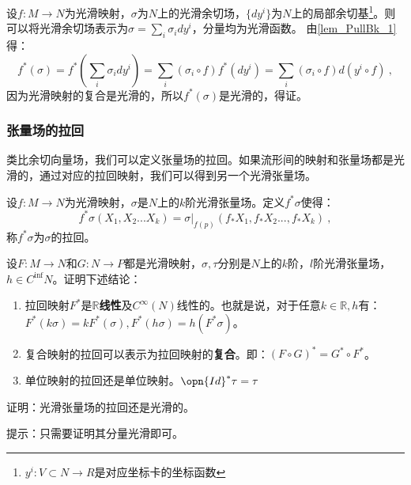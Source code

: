 设$f:M\rightarrow N$为光滑映射，$\sigma$为$N$上的光滑余切场，$\{dy^i\}$为$N$上的局部余切基\footnote{$y^i:V\subset N\rightarrow R$是对应坐标卡的坐标函数}。则可以将光滑余切场表示为$\sigma=\sum_i\sigma_idy^i $，分量均为光滑函数。
由\autoref{lem_PullBk_1} 得：
\begin{equation}
f^*(\sigma)=f^*(\sum_i\sigma_idy^i)=\sum_i(\sigma_i\circ f)f^*(dy^i)=\sum_i(\sigma_i\circ f)d(y^i\circ f)~,
\end{equation}
因为光滑映射的复合是光滑的，所以$f^*(\sigma)$是光滑的，得证。
\subsubsection{张量场的拉回}
类比余切向量场，我们可以定义张量场的拉回。如果流形间的映射和张量场都是光滑的，通过对应的拉回映射，我们可以得到另一个光滑张量场。
\begin{definition}{}
设$f:M\rightarrow N$为光滑映射，$\sigma$是$N$上的$k$阶光滑张量场。定义$f^*\sigma$使得：
\begin{equation}
f^*\sigma(X_1,X_2...X_k)=\sigma|_{f(p)}(f_*X_1,f_*X_2...,f_*X_k)~,
\end{equation}
称$f^*\sigma$为$\sigma$的拉回。
\end{definition}
\begin{exercise}{}
设$F:M\rightarrow N$和$G:N\rightarrow P$都是光滑映射，$\sigma,\tau$分别是$N$上的$k$阶，$l$阶光滑张量场，$h\in C^{\inf}N$。证明下述结论：
\begin{enumerate}
\item 拉回映射$F^*$是$\mathbb R$\textbf{线性}及$C^{\infty }(N)$线性的。也就是说，对于任意$k\in \mathbb R,h$有：$F^*(k\sigma)=kF^*(\sigma),F^*(h\sigma)=h(F^*\sigma)$。
\item 复合映射的拉回可以表示为拉回映射的\textbf{复合}。即：$(F\circ G)^{*}=G^*\circ F^*$。
\item 单位映射的拉回还是单位映射。$\opn{Id}^*\tau=\tau$
\end{enumerate}
\end{exercise}
\begin{exercise}{}
证明：光滑张量场的拉回还是光滑的。

提示：只需要证明其分量光滑即可。
\end{exercise}

